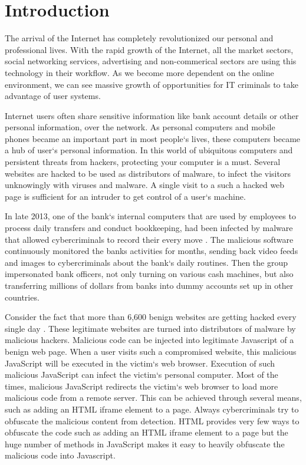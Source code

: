 \chapter{Introduction}

The arrival of the Internet has completely revolutionized our personal and professional lives. With the rapid growth of the Internet, all the market sectors, social networking services, advertising and non-commerical sectors are using this technology in their workflow. As we become more dependent on the online environment, we can see massive growth of opportunities for IT criminals to take advantage of user systems. 

Internet users often share sensitive information like bank account details or other personal information, over the network. As personal computers and mobile phones became an important part in most people`s lives, these computers became a hub of user`s personal information. In this world of ubiquitous computers and persistent threats from hackers, protecting your computer is a must. Several websites are hacked to be used as distributors of malware, to infect the visitors unknowingly with viruses and malware. A single visit to a such a hacked web page is sufficient for an intruder to get control of a user`s machine.

In late 2013, one of the bank`s internal computers that are used by employees to process daily transfers and conduct bookkeeping, had been infected by malware that allowed cybercriminals to record their every move \cite{bib7}. The malicious software continuously monitored the banks activities for months, sending back video feeds and images to cybercriminals about the bank`s daily routines. Then the group impersonated bank officers, not only turning on various cash machines, but also transferring millions of dollars from banks into dummy accounts set up in other countries.

Consider the fact that more than 6,600 benign websites are getting hacked every single day \cite{bib6}. These legitimate websites are turned into distributors of malware by malicious hackers. Malicious code can be injected into legitimate Javascript of a benign web page. When a user visits such a compromised website, this malicious JavaScript will be executed in the victim`s web browser. Execution of such malicious JavaScript can infect the victim`s personal computer. Most of the times, malicious JavaScript redirects the victim`s web browser to load more malicious code from a remote server. This can be achieved through several means, such as adding an HTML iframe element to a page. Always cybercriminals try to obfuscate the malicious content from detection. HTML provides very few ways to obfuscate the code such as adding an HTML iframe element to a page but the huge number of methods in JavaScript makes it easy to heavily obfuscate the malicious code into Javascript.

